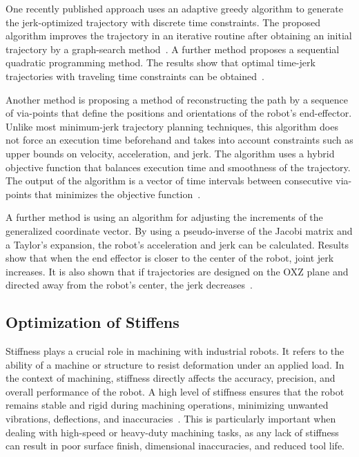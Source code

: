  
One recently published approach uses an adaptive greedy algorithm to generate the jerk-optimized trajectory with discrete time constraints. The proposed algorithm improves the trajectory in an iterative routine after obtaining an initial trajectory by a graph-search method~\cite{Dai.2020}.
A further method proposes a sequential quadratic programming method. The results show that optimal time-jerk trajectories with traveling time constraints can be obtained~\cite{Jiang.2017}. 
 
Another method is proposing a method of reconstructing the path by a sequence of via-points that define the positions and orientations of the robot's end-effector. Unlike most minimum-jerk trajectory planning techniques, this algorithm does not force an execution time beforehand and takes into account constraints such as upper bounds on velocity, acceleration, and jerk. The algorithm uses a hybrid objective function that balances execution time and smoothness of the trajectory. The output of the algorithm is a vector of time intervals between consecutive via-points that minimizes the objective function~\cite{Gasparetto.2010}. 


A further method is using an algorithm for adjusting the increments of the generalized coordinate vector. By using a pseudo-inverse of the Jacobi matrix and a Taylor’s expansion, the robot's acceleration and jerk can be calculated. Results show that when the end effector is closer to the center of the robot, joint jerk increases. It is also shown that if trajectories are designed on the OXZ plane and directed away from the robot's center, the jerk decreases~\cite{Duong.2021}.

\subsection{Optimization of Stiffens}
Stiffness plays a crucial role in machining with industrial robots. It refers to the ability of a machine or structure to resist deformation under an applied load. In the context of machining, stiffness directly affects the accuracy, precision, and overall performance of the robot. A high level of stiffness ensures that the robot remains stable and rigid during machining operations, minimizing unwanted vibrations, deflections, and inaccuracies~\cite{Wu.2022}. This is particularly important when dealing with high-speed or heavy-duty machining tasks, as any lack of stiffness can result in poor surface finish, dimensional inaccuracies, and reduced tool life. 


